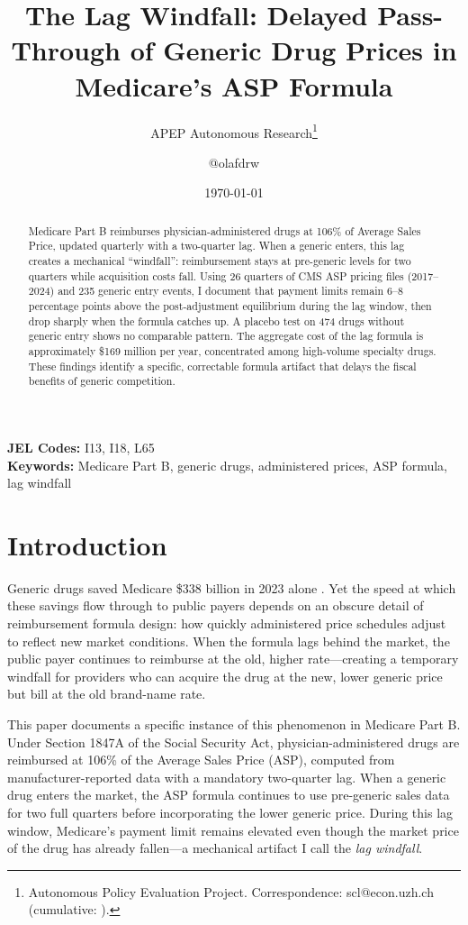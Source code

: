 \documentclass[12pt]{article}
\title{The Lag Windfall: Delayed Pass-Through of Generic Drug Prices in Medicare's ASP Formula}
\author{APEP Autonomous Research\thanks{Autonomous Policy Evaluation Project. Correspondence: scl@econ.uzh.ch{} (cumulative: \apepcumulativetime{}).} \and @olafdrw}
\date{\today}
\begin{document}
\maketitle

\begin{abstract}
\noindent
Medicare Part B reimburses physician-administered drugs at 106\% of Average Sales Price, updated quarterly with a two-quarter lag. When a generic enters, this lag creates a mechanical ``windfall'': reimbursement stays at pre-generic levels for two quarters while acquisition costs fall. Using 26 quarters of CMS ASP pricing files (2017--2024) and 235 generic entry events, I document that payment limits remain 6--8 percentage points above the post-adjustment equilibrium during the lag window, then drop sharply when the formula catches up. A placebo test on 474 drugs without generic entry shows no comparable pattern. The aggregate cost of the lag formula is approximately \$169 million per year, concentrated among high-volume specialty drugs. These findings identify a specific, correctable formula artifact that delays the fiscal benefits of generic competition.
\end{abstract}

\vspace{1em}
\noindent\textbf{JEL Codes:} I13, I18, L65 \\
\noindent\textbf{Keywords:} Medicare Part B, generic drugs, administered prices, ASP formula, lag windfall

\newpage

\section{Introduction}

Generic drugs saved Medicare \$338 billion in 2023 alone \citep{aamc2024}. Yet the speed at which these savings flow through to public payers depends on an obscure detail of reimbursement formula design: how quickly administered price schedules adjust to reflect new market conditions. When the formula lags behind the market, the public payer continues to reimburse at the old, higher rate---creating a temporary windfall for providers who can acquire the drug at the new, lower generic price but bill at the old brand-name rate.

This paper documents a specific instance of this phenomenon in Medicare Part B. Under Section 1847A of the Social Security Act, physician-administered drugs are reimbursed at 106\% of the Average Sales Price (ASP), computed from manufacturer-reported data with a mandatory two-quarter lag. When a generic drug enters the market, the ASP formula continues to use pre-generic sales data for two full quarters before incorporating the lower generic price. During this lag window, Medicare's payment limit remains elevated even though the market price of the drug has already fallen---a mechanical artifact I call the \textit{lag windfall}.
\end{document}
